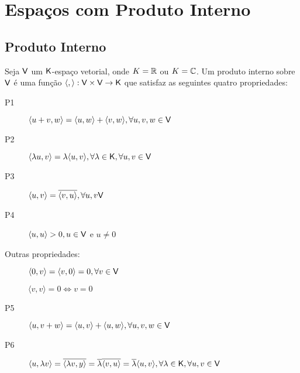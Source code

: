 \documentclass[10pt,a4paper]{book}
\begin{document}
\chapter{Espaços com Produto Interno}

\section{Produto Interno}

\begin{definition}
	Seja $\mathsf{ V }$ um $\mathsf{ K }$-espaço vetorial, onde $K = \mathbb{ R }$ ou $K = \mathbb{ C }$. Um produto interno sobre $\mathsf{ V }$ é uma função $\langle, \rangle : \mathsf{ V } \times \mathsf{ V } \rightarrow \mathsf{ K }$ que satisfaz as seguintes quatro propriedades:
	\begin{description}
		\item [P1] $\langle u + v, w\rangle = \langle u, w\rangle + \langle v, w\rangle, \forall u, v, w \in \mathsf{ V }$ 
		\item [P2] $\langle \lambda u, v\rangle = \lambda\langle u, v\rangle, \forall \lambda \in \mathsf{ K },  \forall u, v \in \mathsf{ V }$ 
		\item [P3] $\langle u, v\rangle = \overline{\langle v, u\rangle}, \forall u, v \mathsf{ V }$ 
		\item [P4] $\langle u, u\rangle > 0, u \in \mathsf{ V }$ e $u \neq 0$ 
	\end{description}
\end{definition}


\begin{lemma}
	Outras propriedades:
	\begin{description} 
		\item [] $\langle 0, v\rangle = \langle v, 0\rangle = 0, \forall v \in \mathsf{ V }$ 
		\item [] $\langle v, v\rangle = 0 \Leftrightarrow v = 0$ 
		\item [P5] $\langle u, v + w\rangle = \langle u, v\rangle + \langle u, w\rangle, \forall u, v, w \in \mathsf{ V }$
		\item [P6] $\langle u, \lambda v \rangle = \overline{\langle \lambda v, y\rangle} = \overline{\lambda} \overline{ \langle v, u\rangle} = \overline{\lambda} \langle u, v \rangle , \forall \lambda \in \mathsf{ K },  \forall u, v \in \mathsf{ V }$ 
	\end{description}
\end{lemma}
\end{document}
